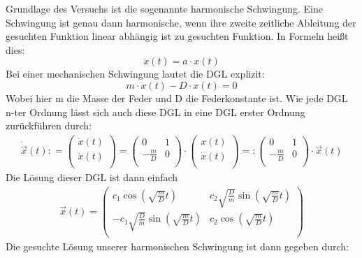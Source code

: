 \documentclass[fontsize=12pt]{scrartcl}
\newcommand{\define}{\ensuremath{\mathrel{\mathop:}=}} %
\newcommand{\enifed}{\ensuremath{=\mathrel{\mathop:}}} %
\begin{document}
Grundlage des Versuchs ist die sogenannte harmonische Schwingung. Eine Schwingung ist genau dann harmonische, wenn ihre zweite zeitliche Ableitung der gesuchten Funktion linear abhängig ist zu gesuchten Funktion. In Formeln heißt dies:
\begin{equation*}
\ddot{x}(t) = a\cdot x(t)
\end{equation*}
Bei einer mechanischen Schwingung lautet die DGL explizit:
\begin{equation*}
m\cdot \ddot{x}(t) - D\cdot x(t) = 0
\end{equation*}
Wobei hier m die Masse der Feder und D die Federkonstante ist.
Wie jede DGL n-ter Ordnung lässt sich auch diese DGL in eine DGL erster Ordnung zurückführen durch:
\begin{align*}
\dot{\vec{x}}(t)
\define
{\begin{pmatrix}
 \dot{x}(t)  \\
 \ddot{x}(t)  \\
\end{pmatrix}}
=
\begin{pmatrix}
0 & 1  \\
-\frac{m}{D} & 0  \\
\end{pmatrix}
\cdot 
\begin{pmatrix}
{x}(t)  \\
 \dot{x}(t)  \\
\end{pmatrix}
\enifed
\begin{pmatrix}
0 & 1  \\
-\frac{m}{D} & 0  \\
\end{pmatrix}
\cdot
\vec{x}(t)
\end{align*}
Die Lösung dieser DGL ist dann einfach
\begin{align*}
\vec{x}(t)
=
\begin{pmatrix}
c_1 \cos(\sqrt{\frac{m}{D}}t) &c_2 \sqrt{\frac{D}{m}} \sin(\sqrt{\frac{m}{D}}t)  \\
-c_1 \sqrt{\frac{D}{m}} \sin(\sqrt{\frac{m}{D}}t) &c_2 \cos(\sqrt{\frac{m}{D}}t) \\
\end{pmatrix}
\end{align*}
Die gesuchte Lösung unserer harmonischen Schwingung ist dann gegeben durch:
\end{document}
